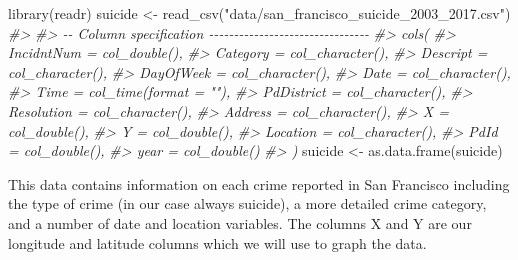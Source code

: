\documentclass[
  12pt,
  openany]{book}
\newenvironment{Shaded}{\begin{snugshade}}{\end{snugshade}}
\newcommand{\CommentTok}[1]{\textcolor[rgb]{0.37,0.37,0.37}{\textit{#1}}}
\newcommand{\FunctionTok}[1]{\textcolor[rgb]{0,0,0}{#1}}
\newcommand{\NormalTok}[1]{#1}
\newcommand{\OtherTok}[1]{\textcolor[rgb]{0.37,0.37,0.37}{#1}}
\newcommand{\StringTok}[1]{\textcolor[rgb]{0.5,0.5,0.5}{#1}}
\begin{document}
\begin{Shaded}
\begin{Highlighting}[]
\FunctionTok{library}\NormalTok{(readr)}
\NormalTok{suicide }\OtherTok{\textless{}{-}} \FunctionTok{read\_csv}\NormalTok{(}\StringTok{"data/san\_francisco\_suicide\_2003\_2017.csv"}\NormalTok{)}
\CommentTok{\#\textgreater{} }
\CommentTok{\#\textgreater{} {-}{-} Column specification {-}{-}{-}{-}{-}{-}{-}{-}{-}{-}{-}{-}{-}{-}{-}{-}{-}{-}{-}{-}{-}{-}{-}{-}{-}{-}{-}{-}{-}{-}{-}{-}}
\CommentTok{\#\textgreater{} cols(}
\CommentTok{\#\textgreater{}   IncidntNum = col\_double(),}
\CommentTok{\#\textgreater{}   Category = col\_character(),}
\CommentTok{\#\textgreater{}   Descript = col\_character(),}
\CommentTok{\#\textgreater{}   DayOfWeek = col\_character(),}
\CommentTok{\#\textgreater{}   Date = col\_character(),}
\CommentTok{\#\textgreater{}   Time = col\_time(format = ""),}
\CommentTok{\#\textgreater{}   PdDistrict = col\_character(),}
\CommentTok{\#\textgreater{}   Resolution = col\_character(),}
\CommentTok{\#\textgreater{}   Address = col\_character(),}
\CommentTok{\#\textgreater{}   X = col\_double(),}
\CommentTok{\#\textgreater{}   Y = col\_double(),}
\CommentTok{\#\textgreater{}   Location = col\_character(),}
\CommentTok{\#\textgreater{}   PdId = col\_double(),}
\CommentTok{\#\textgreater{}   year = col\_double()}
\CommentTok{\#\textgreater{} )}
\NormalTok{suicide }\OtherTok{\textless{}{-}} \FunctionTok{as.data.frame}\NormalTok{(suicide)}
\end{Highlighting}
\end{Shaded}

This data contains information on each crime reported in San Francisco including the type of crime (in our case always suicide), a more detailed crime category, and a number of date and location variables. The columns X and Y are our longitude and latitude columns which we will use to graph the data.
\end{document}
